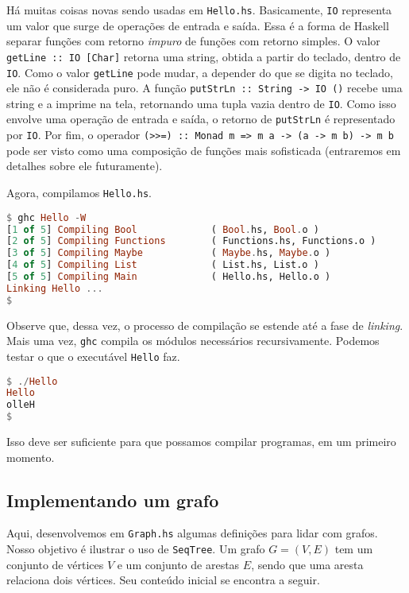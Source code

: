 \documentclass[a4paper]{article}
\begin{document}
Há muitas coisas novas sendo usadas em \texttt{Hello.hs}.
Basicamente, \texttt{IO} representa um valor que surge de operações de entrada e saída.
Essa é a forma de Haskell separar funções com retorno \emph{impuro} de funções com retorno simples.
O valor \mbox{\texttt{getLine :: IO [Char]}} retorna uma string, obtida a partir do teclado, dentro de \texttt{IO}.
Como o valor \texttt{getLine} pode mudar, a depender do que se digita no teclado, ele não é considerada puro.
A função \mbox{\texttt{putStrLn :: String -> IO ()}} recebe uma string e a imprime na tela, retornando uma tupla vazia dentro de \texttt{IO}.
Como isso envolve uma operação de entrada e saída, o retorno de \texttt{putStrLn} é representado por \texttt{IO}.
Por fim, o operador \mbox{\texttt{(>>=) :: Monad m => m a -> (a -> m b) -> m b}} pode ser visto como uma composição de funções mais sofisticada (entraremos em detalhes sobre ele futuramente).

Agora, compilamos \texttt{Hello.hs}.

\begin{lstlisting}[language=haskell, frame=single]
$ ghc Hello -W
[1 of 5] Compiling Bool             ( Bool.hs, Bool.o )
[2 of 5] Compiling Functions        ( Functions.hs, Functions.o )
[3 of 5] Compiling Maybe            ( Maybe.hs, Maybe.o )
[4 of 5] Compiling List             ( List.hs, List.o )
[5 of 5] Compiling Main             ( Hello.hs, Hello.o )
Linking Hello ...
$
\end{lstlisting}

Observe que, dessa vez, o processo de compilação se estende até a fase de \emph{linking}.
Mais uma vez, \texttt{ghc} compila os módulos necessários recursivamente.
Podemos testar o que o executável \texttt{Hello} faz.

\begin{lstlisting}[language=haskell, frame=single]
$ ./Hello
Hello
olleH
$
\end{lstlisting}

Isso deve ser suficiente para que possamos compilar programas, em um primeiro momento.

\subsection{Implementando um grafo}

Aqui, desenvolvemos em \texttt{Graph.hs} algumas definições para lidar com grafos.
Nosso objetivo é ilustrar o uso de \texttt{SeqTree}.
Um grafo \mbox{$G = (V, E)$} tem um conjunto de vértices $V$ e um conjunto de arestas $E$, sendo que uma aresta relaciona dois vértices.
Seu conteúdo inicial se encontra a seguir.
\end{document}
